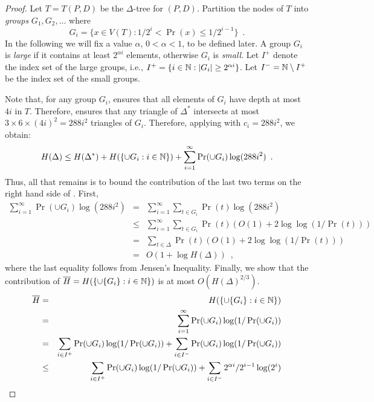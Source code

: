 \documentclass[lotsofwhite]{patmorin}
\begin{document}
\begin{proof}
Let $T=T(P,D)$ be the $\Delta$-tree for $(P,D)$.
Partition the nodes of $T$ into
\emph{groups} $G_1,G_2,\ldots$ where
\[
	G_i = \{x\in V(T) : 1/2^{i} < \Pr(x) \le 1/2^{i-1} \} \enspace .
\]
In the following we will fix a value $\alpha$, $0 < \alpha < 1$, to be
defined later.  A group $G_i$ is \emph{large} if it contains at least
$2^{\alpha i}$ elements, otherwise $G_i$ is \emph{small}.  Let $I^+$
denote the index set of the large groups, i.e., $I^{+}=\{i\in\mathbb{N} :
|G_i| \ge 2^{\alpha i}\}$.  Let $I^{-}= \mathbb{N}\setminus I^+$ be the index
set of the small groups.

Note that, for any group $G_i$,  ensures that all
elements of $G_i$ have depth at most $4i$ in $T$.  Therefore, 
 ensures that any triangle of
$\Delta^*$ intersects at most $3\times 6\times (4i)^2=288i^2$ 
triangles of $G_{i}$.  Therefore,
applying  with $c_{i}=288i^2$, we obtain:
\begin{equation} 
 H(\Delta) \le 
   H(\Delta^*) + H(\{{\cup G_{i}} : i\in\N\}) 
   + \sum_{i=1}^{\infty}\Pr(\cup G_{i})\log(288i^2)  \enspace .
   \eqlabelx{doit}
\end{equation}
Thus, all that remains is to bound the contribution of the last two
terms on the right hand side of .  First,
\begin{eqnarray*}
   \sum_{i=1}^{\infty}\Pr(\cup G_{i})\log(288i^2)
   &   =  & \sum_{i=1}^\infty\sum_{t\in G_i}\Pr(t)\log(288i^2) \\
   &  \le  & \sum_{i=1}^\infty\sum_{t\in G_i}\Pr(t)(O(1)+2\log\log(1/\Pr(t))) \\
    &  =  & \sum_{t\in\Delta} \Pr(t) (O(1)+2\log\log(1/\Pr(t))) \\
    &  =  & O(1+\log H(\Delta)) \enspace ,
\end{eqnarray*}
where the last equality follows from Jensen's Inequality.
Finally, we show that the contribution of $\overline
H=H(\{\cup\{G_{i}\} : i\in\mathbb{N}\})$ is at most
$O(H(\Delta)^{2/3})$. 
\begin{eqnarray*}
\overline H 
 &  =  & H(\{\cup\{G_{i}\} : i\in\N\}) \\
 &  =  & \sum_{i=1}^\infty\Pr(\cup G_{i})\log(1/\Pr(\cup G_{i})) \\
 &  =  & \sum_{i\in I^+}\Pr(\cup G_{i})\log(1/\Pr(\cup G_{i})) 
         + \sum_{i\in I^-}\Pr(\cup G_{i})\log(1/\Pr(\cup G_{i})) \\
 & \le & \sum_{i\in I^+}\Pr(\cup G_{i})\log(1/\Pr(\cup G_{i})) 
         + \sum_{i\in I^-}2^{\alpha i}/2^{i-1}\log(2^{i}) \\

\end{eqnarray*}
\end{proof}
\end{document}
